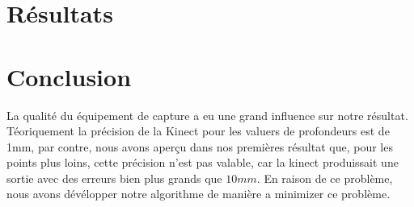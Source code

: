 \documentclass[a4paper,12pt]{article}
\begin{document}
\section{Résultats}

\section{Conclusion}


% 
% 


La qualité du équipement de capture a eu une grand influence sur notre
résultat. Téoriquement la précision de la Kinect pour les valuers de
profondeurs est de 1mm, par contre, nous avons aperçu dans nos
premières résultat que, pour les points plus loins, cette
précision n'est pas valable, car la kinect produissait une sortie avec
des erreurs bien plus grands que $10 mm$. 
En raison de ce problème, nous avons dévélopper notre algorithme de
manière a minimizer ce problème.
\end{document}
